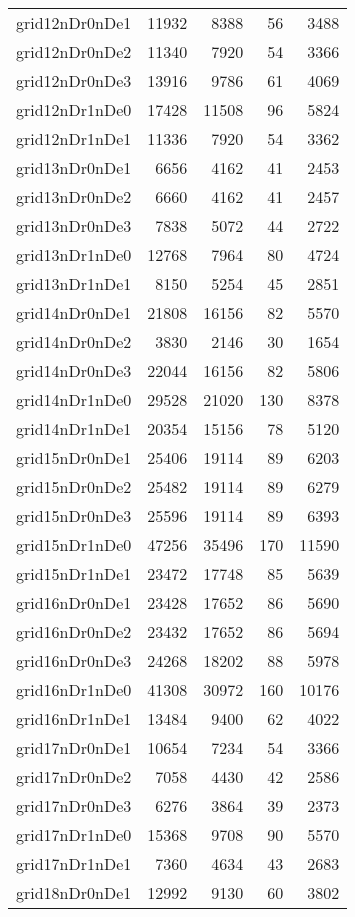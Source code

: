 \begin{tabular}{lrrrr}
grid12nDr0nDe1 & 11932 & 8388 & 56 & 3488 \\
grid12nDr0nDe2 & 11340 & 7920 & 54 & 3366 \\
grid12nDr0nDe3 & 13916 & 9786 & 61 & 4069 \\
grid12nDr1nDe0 & 17428 & 11508 & 96 & 5824 \\
grid12nDr1nDe1 & 11336 & 7920 & 54 & 3362 \\
grid13nDr0nDe1 & 6656 & 4162 & 41 & 2453 \\
grid13nDr0nDe2 & 6660 & 4162 & 41 & 2457 \\
grid13nDr0nDe3 & 7838 & 5072 & 44 & 2722 \\
grid13nDr1nDe0 & 12768 & 7964 & 80 & 4724 \\
grid13nDr1nDe1 & 8150 & 5254 & 45 & 2851 \\
grid14nDr0nDe1 & 21808 & 16156 & 82 & 5570 \\
grid14nDr0nDe2 & 3830 & 2146 & 30 & 1654 \\
grid14nDr0nDe3 & 22044 & 16156 & 82 & 5806 \\
grid14nDr1nDe0 & 29528 & 21020 & 130 & 8378 \\
grid14nDr1nDe1 & 20354 & 15156 & 78 & 5120 \\
grid15nDr0nDe1 & 25406 & 19114 & 89 & 6203 \\
grid15nDr0nDe2 & 25482 & 19114 & 89 & 6279 \\
grid15nDr0nDe3 & 25596 & 19114 & 89 & 6393 \\
grid15nDr1nDe0 & 47256 & 35496 & 170 & 11590 \\
grid15nDr1nDe1 & 23472 & 17748 & 85 & 5639 \\
grid16nDr0nDe1 & 23428 & 17652 & 86 & 5690 \\
grid16nDr0nDe2 & 23432 & 17652 & 86 & 5694 \\
grid16nDr0nDe3 & 24268 & 18202 & 88 & 5978 \\
grid16nDr1nDe0 & 41308 & 30972 & 160 & 10176 \\
grid16nDr1nDe1 & 13484 & 9400 & 62 & 4022 \\
grid17nDr0nDe1 & 10654 & 7234 & 54 & 3366 \\
grid17nDr0nDe2 & 7058 & 4430 & 42 & 2586 \\
grid17nDr0nDe3 & 6276 & 3864 & 39 & 2373 \\
grid17nDr1nDe0 & 15368 & 9708 & 90 & 5570 \\
grid17nDr1nDe1 & 7360 & 4634 & 43 & 2683 \\
grid18nDr0nDe1 & 12992 & 9130 & 60 & 3802 \\

\end{tabular}
